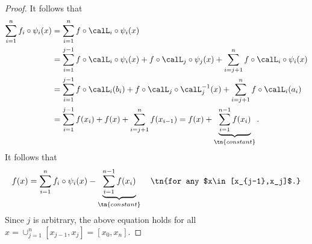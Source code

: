 \documentclass[review,hidelinks,onefignum,onetabnum]{siamart250211}
\begin{document}
\begin{proof}
It follows that
\begin{equation*}
    \begin{split}
        \sum_{i=1}^n f_i\circ \psi_i(x)
        &=\sum_{i=1}^n f\circ \calL_i\circ \psi_i(x)
    \\&=\sum_{i=1}^{j-1} f\circ \calL_i\circ \psi_i(x)
    +f\circ \calL_j\circ \psi_j(x)
    +\sum_{i=j+1}^n f\circ \calL_i\circ \psi_i(x)
    \\& = \sum_{i=1}^{j-1} f\circ \calL_i(b_i)
    +f\circ \calL_j\circ\calL_j^{-1}(x) 
    +\sum_{i=j+1}^n f\circ \calL_i(a_i)
    \\& = \sum_{i=1}^{j-1} f (x_i)
    +f(x)
    +\sum_{i=j+1}^n f (x_{i-1})
    =f(x)+\underbrace{\sum_{i=1}^{n-1}f(x_i)}_{\tn{constant}}.
    \end{split}
\end{equation*}
It follows that
\begin{equation*}
    \begin{split}
        f(x)=\sum_{i=1}^n f_i\circ \psi_i(x)
    -\underbrace{\sum_{i=1}^{n-1}f(x_i)}_{\tn{constant}}\quad \tn{for any $x\in [x_{j-1},x_j]$.}
    \end{split}
\end{equation*}
Since $j$ is arbitrary, the above equation holds for all
$x=\cup_{j=1}^n[x_{j-1}, x_j]= [x_0,x_n]$. 
\end{proof}
\end{document}
